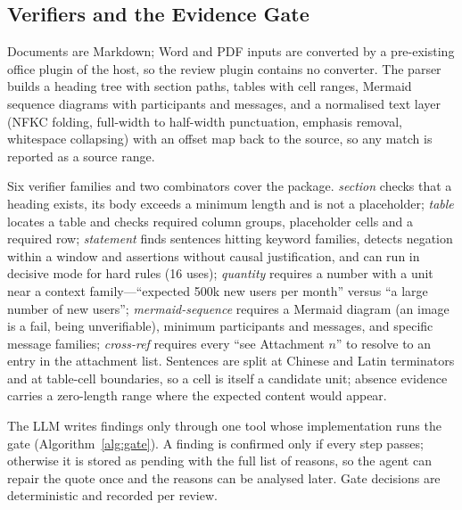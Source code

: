 \documentclass{IOS-Book-Article}
\begin{document}
\subsection{Verifiers and the Evidence Gate}

Documents are Markdown; Word and PDF inputs are converted by a pre-existing office plugin of the host, so the review plugin contains no converter. The parser builds a heading tree with section paths, tables with cell ranges, Mermaid sequence diagrams with participants and messages, and a normalised text layer (NFKC folding, full-width to half-width punctuation, emphasis removal, whitespace collapsing) with an offset map back to the source, so any match is reported as a source range.

Six verifier families and two combinators cover the package. \emph{section} checks that a heading exists, its body exceeds a minimum length and is not a placeholder; \emph{table} locates a table and checks required column groups, placeholder cells and a required row; \emph{statement} finds sentences hitting keyword families, detects negation within a window and assertions without causal justification, and can run in decisive mode for hard rules (16 uses); \emph{quantity} requires a number with a unit near a context family---``expected 500k new users per month'' versus ``a large number of new users''; \emph{mermaid-sequence} requires a Mermaid diagram (an image is a fail, being unverifiable), minimum participants and messages, and specific message families; \emph{cross-ref} requires every ``see Attachment $n$'' to resolve to an entry in the attachment list. Sentences are split at Chinese and Latin terminators and at table-cell boundaries, so a cell is itself a candidate unit; absence evidence carries a zero-length range where the expected content would appear.

The LLM writes findings only through one tool whose implementation runs the gate (Algorithm~\ref{alg:gate}). A finding is confirmed only if every step passes; otherwise it is stored as pending with the full list of reasons, so the agent can repair the quote once and the reasons can be analysed later. Gate decisions are deterministic and recorded per review.
\end{document}
